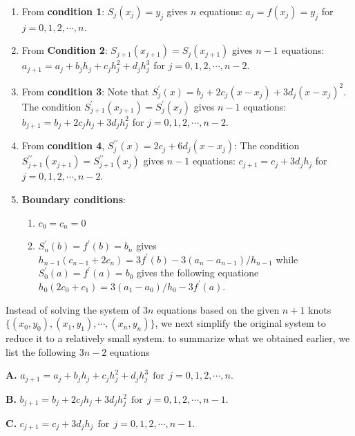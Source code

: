 \documentclass[
]{book}
\begin{document}
\begin{enumerate}
\def\labelenumi{\arabic{enumi}.}
\item
  From \textbf{condition 1}: \(S_j(x_j) = y_j\) gives \(n\) equations: \(a_j = f(x_j) = y_j\) for \(j = 0, 1, 2,\cdots, n\).
\item
  From \textbf{Condition 2}: \(S_{j+1}(x_{j+1}) = S_j(x_{j+1})\) gives \(n-1\) equations: \(a_{j+1} = a_j + b_jh_j + c_jh_j^2 + d_jh_j^3\) for \(j = 0, 1, 2,\cdots, n-2\).
\item
  From \textbf{condition 3}: Note that \(S^\prime_j (x) = b_j + 2c_j (x - x_j ) + 3d_j(x - x_j)^2\). The condition \(S_{j+1}^\prime(x_{j+1}) = S_j^\prime(x_j)\) gives \(n - 1\) equations: \(b_{j+1} = b_j + 2c_jh_j + 3d_jh_j^2\) for \(j = 0, 1, 2, \cdots, n-2\).
\item
  From \textbf{condition 4}, \(S^{\prime\prime}_j (x) = 2c_j + 6d_j(x - x_j)\): The condition \(S_{j+1}^{\prime\prime}(x_{j+1}) = S_{j+1}^{\prime\prime}(x_{j})\) gives \(n-1\) equations: \(c_{j+1} = c_j + 3d_jh_j\) for \(j = 0, 1, 2, \cdots, n-2\).
\item
  \textbf{Boundary conditions}:

  \begin{enumerate}
  \def\labelenumii{\alph{enumii})}
  \item
    \(c_0 = c_n = 0\)
  \item
    \(S^\prime_n (b) = f^\prime(b) = b_n\) gives \(h_{n-1}(c_{n-1}+ 2c_n)= 3f^\prime (b) -3(a_n- a_{n-1})/h_{n-1}\) while \(S^\prime_0(a) = f^\prime (a) = b_0\) gives the following equatione \(h_0(2c_0 + c_1) = 3(a_1- a_0)/h_0-3f^\prime (a)\).
  \end{enumerate}
\end{enumerate}

\hfill\break

Instead of solving the system of \(3n\) equations based on the given \(n+1\) knots \(\{(x_0,y_0), (x_1, y_1), \cdots, (x_n, y_n) \}\), we next simplify the original system to reduce it to a relatively small system. to summarize what we obtained earlier, we list the following \(3n-2\) equations

\textbf{A.} \(a_{j+1} = a_j + b_jh_j + c_jh_j^2 + d_jh_j^3 ~~\text{for}~~ j = 0, 1, 2, \cdots, n.\)

\textbf{B.} \(b_{j+1} = b_j + 2c_jh_j + 3d_jh_j^2 ~~\text{for}~~ j = 0, 1, 2, \cdots, n-1.\)

\textbf{C.} \(c_{j+1} = c_j + 3d_jh_j ~~\text{for}~~ j = 0, 1, 2, \cdots, n-1.\)
\end{document}
